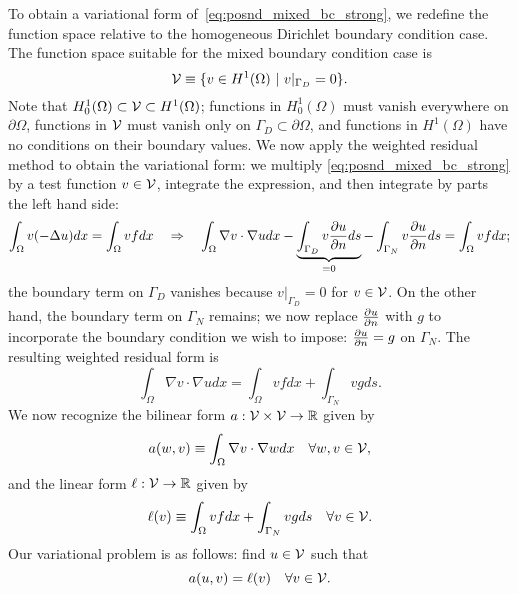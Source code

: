 To obtain a variational form of~\eqref{eq:posnd_mixed_bc_strong},  we redefine the function space relative to the homogeneous Dirichlet boundary condition case.  The function space suitable for the mixed boundary condition case is
\begin{equation}
  \mathcal{V} \equiv \{ v \in H^1(\Omega) \ | \ v|_{\Gamma_D} = 0 \}.
  \label{eq:posnd_mixed_bc_space}
\end{equation}
Note that $H^1_0(\Omega) \subset \mathcal{V} \subset H^1(\Omega)$; functions in $H^1_0(\Omega)$ must vanish everywhere on $\partial \Omega$, functions in $\mathcal{V}$ must vanish only on $\Gamma_D \subset \partial \Omega$, and functions in $H^1(\Omega)$ have no conditions on their boundary values. We now apply the weighted residual method to obtain the variational form: we multiply \eqref{eq:posnd_mixed_bc_strong} by a test function $v \in \mathcal{V}$, integrate the expression, and then integrate by parts the left hand side:
\begin{equation*}
  \int_\Omega v (-\Delta u) dx = \int_\Omega v f dx
  \quad \Rightarrow \quad
  \int_\Omega \nabla v \cdot \nabla u dx
  - \underbrace{\int_{\Gamma_D} v \frac{\partial u}{\partial n} ds}_{= 0}
  - \int_{\Gamma_N} v \frac{\partial u}{\partial n} ds
  =
  \int_{\Omega} v f dx;
\end{equation*}
the boundary term on $\Gamma_D$ vanishes because $v|_{\Gamma_D} = 0$ for $v \in \mathcal{V}$. On the other hand, the boundary term on $\Gamma_N$ remains; we now replace $\frac{\partial u}{\partial n}$ with $g$ to incorporate the boundary condition we wish to impose: $\frac{\partial u}{\partial n} = g$ on $\Gamma_N$. The resulting weighted residual form is
\begin{equation*}
  \int_\Omega \nabla v \cdot \nabla u dx
  =
  \int_{\Omega} v f dx
  + \int_{\Gamma_N} v g ds.
\end{equation*}
We now recognize the bilinear form $a: \mathcal{V} \times \mathcal{V} \to \mathbb{R}$ given by
\begin{equation*}
  a(w,v) \equiv \int_\Omega \nabla v \cdot \nabla w dx \quad \forall w,v \in \mathcal{V},
\end{equation*}
and the linear form $\ell: \mathcal{V} \to \mathbb{R}$ given by
\begin{equation*}
  \ell(v) \equiv \int_\Omega v f dx + \int_{\Gamma_N} v g ds \quad \forall v \in \mathcal{V}.
\end{equation*}
Our variational problem is as follows: find $u \in \mathcal{V}$ such that
\begin{equation}
  a(u,v) = \ell(v) \quad \forall v \in \mathcal{V}. \label{eq:posnd_mixed_bc_weak}
\end{equation}


